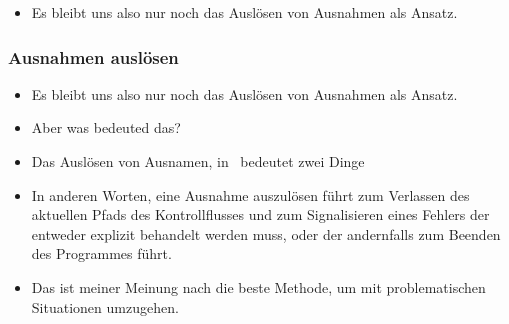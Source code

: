 \documentclass[aspectratio=169,mathserif,notheorems]{beamer}%
\begin{document}
\begin{frame}[t]
\begin{itemize}
{\begin{enumerate}
{{\begin{itemize}
\item<18-> Natürlich funktioniert  auch mit~ als Input und liefert dann~.%
\item<19-> Jetzt gibt es also plötzlich Leute, die unsere Funktion mit Strings benutzen.%
\item<20-> Und \emph{wir werden diesen Use-Case jetzt immer weiter unterstützen müssen.}%
\item<21-> Denn jetzt gibt es Kode in anderen Programmen, der sich darauf verlässt, dass das geht.%
\item<22-> Wenn wir es uns jetzt anders überlegen und keine Strings mehr erlauben{\dots} {\dots}dann wird dieser Kode abstürzen.%
\item<23-> Das Bereinigen von Eingabedaten lädt also geradezu zu schlampigem Programmieren ein.%
\end{itemize}%
}}%
\end{enumerate}}%
%
\item<24-> Es bleibt uns also nur noch das Auslösen von Ausnahmen als Ansatz.%
\end{itemize}%
\end{frame}%
%
\begin{frame}%
\frametitle{Ausnahmen auslösen}%
\begin{itemize}%
\item Es bleibt uns also nur noch das Auslösen von Ausnahmen als Ansatz.%
%
\item<2-> Aber was bedeuted das?%
%
\item<3-> Das Auslösen von Ausnamen, in~ bedeutet zwei Dinge%
%
\item<8-> In anderen Worten, eine Ausnahme auszulösen führt zum Verlassen des aktuellen Pfads des Kontrollflusses und zum Signalisieren eines Fehlers der entweder explizit behandelt werden muss, oder der andernfalls zum Beenden des Programmes führt.%
%
\item<9-> Das ist meiner Meinung nach die beste Methode, um mit problematischen Situationen umzugehen.%
\end{itemize}%
\end{frame}%
\end{document}
